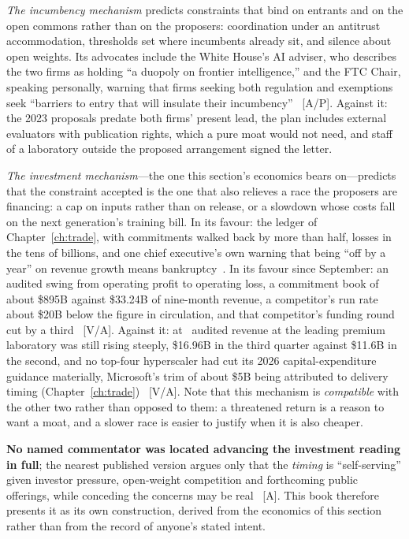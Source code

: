 \emph{The incumbency mechanism} predicts constraints that bind on entrants and on the open commons rather than on the proposers: coordination under an antitrust accommodation, thresholds set where incumbents already sit, and silence about open weights. Its advocates include the White House's AI adviser, who describes the two firms as holding ``a duopoly on frontier intelligence,'' and the FTC Chair, speaking personally, warning that firms seeking both regulation and exemptions seek ``barriers to entry that will insulate their incumbency''~\cite{pacing-readings} [A/P]. Against it: the 2023 proposals predate both firms' present lead, the plan includes external evaluators with publication rights, which a pure moat would not need, and staff of a laboratory outside the proposed arrangement signed the letter.

\emph{The investment mechanism}---the one this section's economics bears on---predicts that the constraint accepted is the one that also relieves a race the proposers are financing: a cap on inputs rather than on release, or a slowdown whose costs fall on the next generation's training bill. In its favour: the ledger of Chapter~\ref{ch:trade}, with commitments walked back by more than half, losses in the tens of billions, and one chief executive's own warning that being ``off by a year'' on revenue growth means bankruptcy~\cite{openai-reset,openai-econ}. In its favour since September: an audited swing from operating profit to operating loss, a commitment book of about \$895B against \$33.24B of nine-month revenue, a competitor's run rate about \$20B below the figure in circulation, and that competitor's funding round cut by a third~\cite{cap-anthropic-s1,mdl-openai-50bn} [V/A]. Against it: at \datafreeze\ audited revenue at the leading premium laboratory was still rising steeply, \$16.96B in the third quarter against \$11.6B in the second, and no top-four hyperscaler had cut its 2026 capital-expenditure guidance materially, Microsoft's trim of about \$5B being attributed to delivery timing (Chapter~\ref{ch:trade})~\cite{cap-anthropic-s1,premium-revenue} [V/A]. Note that this mechanism is \emph{compatible} with the other two rather than opposed to them: a threatened return is a reason to want a moat, and a slower race is easier to justify when it is also cheaper.

\textbf{No named commentator was located advancing the investment reading in full}; the nearest published version argues only that the \emph{timing} is ``self-serving'' given investor pressure, open-weight competition and forthcoming public offerings, while conceding the concerns may be real~\cite{pacing-readings} [A]. This book therefore presents it as its own construction, derived from the economics of this section rather than from the record of anyone's stated intent.

